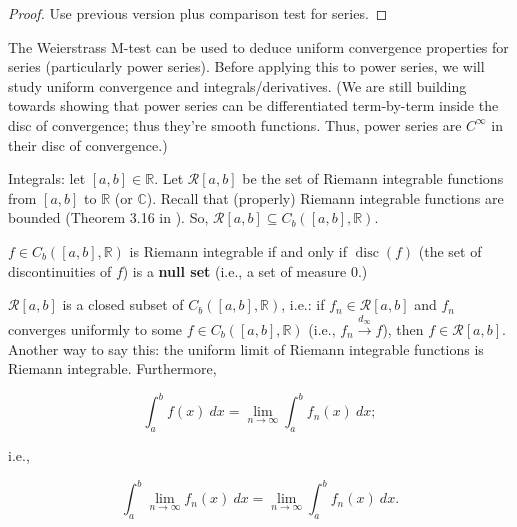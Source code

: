 \begin{proof}

Use previous version plus comparison test for series.

\end{proof}

The Weierstrass M-test can be used to deduce uniform convergence properties for series (particularly power series). Before applying this to power series, we will study uniform convergence and integrals/derivatives. (We are still building towards showing that power series can be differentiated term-by-term inside the disc of convergence; thus they're smooth functions. Thus, power series are \(C^\infty\) in their disc of convergence.)



Integrals: let \([a,b] \in \mathbb{R}\). Let \(\mathcal{R}[a,b]\) be the set of Riemann integrable functions from \([a,b]\) to \(\mathbb{R}\) (or \(\mathbb{C}\)). Recall that (properly) Riemann integrable functions are bounded (Theorem 3.16 in \citet{pugh2015real}). So, \(\mathcal{R}[a,b] \subseteq C_b([a,b], \mathbb{R})\). 


\begin{proposition}

\(f \in C_b([a,b], \mathbb{R})\) is Riemann integrable if and only if \(\operatorname{disc}(f)\) (the set of discontinuities of \(f\)) is a \textbf{null set} (i.e., a set of measure 0.)

\end{proposition}

\begin{theorem}\label{ra.425b.thm.4.6}

\(\mathcal{R}[a,b]\) is a closed subset of \(C_b([a,b], \mathbb{R})\), i.e.: if \(f_n \in \mathcal{R}[a,b]\) and \(f_n\) converges uniformly to some \(f \in C_b([a,b], \mathbb{R})\) (i.e., \(f_n \xrightarrow{d_\infty} f\)), then \(f \in \mathcal{R}[a,b]\). Another way to say this: the uniform limit of Riemann integrable functions is Riemann integrable. Furthermore, 

\begin{equation}\label{ra.425b.thm.4.6.eqn}
\int_a^b f(x) \ dx = \lim_{n \to \infty} \int_a^b f_n(x) \ dx;
\end{equation}

i.e.,

\[
\int_a^b \lim_{n \to \infty} f_n(x) \ dx = \lim_{n \to \infty} \int_a^b f_n(x) \ dx.
\]

\end{theorem}


